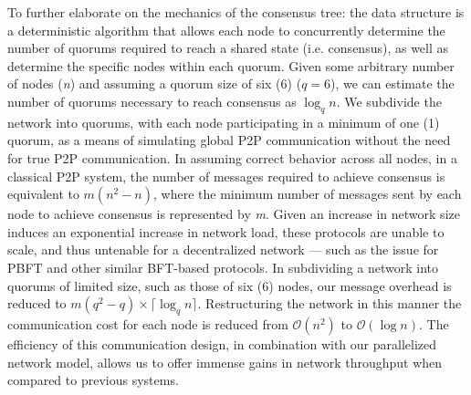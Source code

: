 To further elaborate on the mechanics of the consensus tree: the data structure is a deterministic algorithm that allows each node to concurrently determine the number of quorums required to reach a shared state (i.e. consensus), as well as determine the specific nodes within each quorum. Given some arbitrary number of nodes (\textit{n}) and assuming a quorum size of six (6) (\(q=6\)), we can estimate the number of quorums necessary to reach consensus as \(\log_qn\). We subdivide the network into quorums, with each node participating in a minimum of one (1) quorum, as a means of simulating global P2P communication without the need for true P2P communication. In assuming correct behavior across all nodes, in a classical P2P system, the number of messages required to achieve consensus is equivalent to \({m(n^2-n)}\), where the minimum number of messages sent by each node to achieve consensus is represented by \textit{m}. Given an increase in network size induces an exponential increase in network load, these protocols are unable to scale, and thus untenable for a decentralized network — such as the issue for PBFT and other similar BFT-based protocols. In subdividing a network into quorums of limited size, such as those of six (6) nodes, our message overhead is reduced to \(m(q^2-q) \times \lceil \log_qn \rceil\). Restructuring the network in this manner the communication cost for each node is reduced from \(\mathcal{O}(n^2)\) to \(\mathcal{O}(\log n)\). The efficiency of this communication design, in combination with our parallelized network model, allows us to offer immense gains in network throughput when compared to previous systems.

% 



